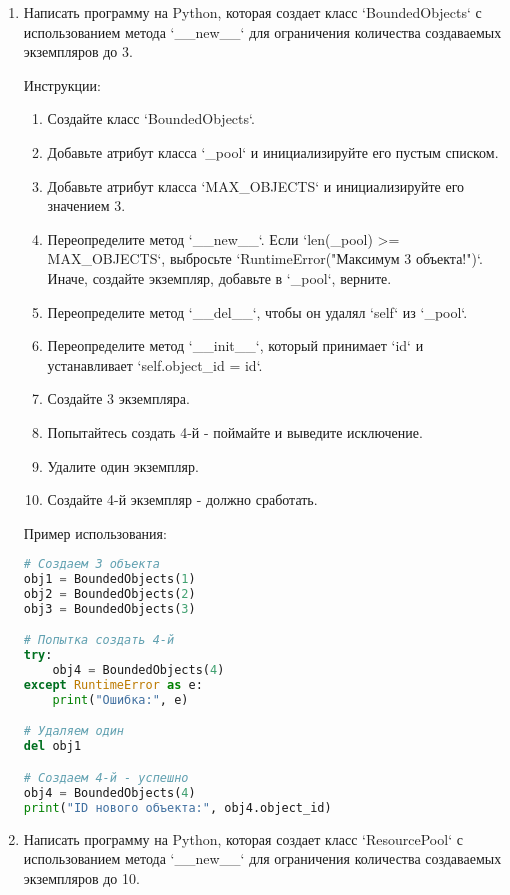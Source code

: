 \begin{enumerate}
\item Написать программу на Python, которая создает класс `BoundedObjects` с использованием метода `\_\_new\_\_` для ограничения количества создаваемых экземпляров до 3.

Инструкции:
\begin{enumerate}
    \item Создайте класс `BoundedObjects`.
    \item Добавьте атрибут класса `\_pool` и инициализируйте его пустым списком.
    \item Добавьте атрибут класса `MAX\_OBJECTS` и инициализируйте его значением 3.
    \item Переопределите метод `\_\_new\_\_`. Если `len(\_pool) >= MAX\_OBJECTS`, выбросьте `RuntimeError("Максимум 3 объекта!")`. Иначе, создайте экземпляр, добавьте в `\_pool`, верните.
    \item Переопределите метод `\_\_del\_\_`, чтобы он удалял `self` из `\_pool`.
    \item Переопределите метод `\_\_init\_\_`, который принимает `id` и устанавливает `self.object\_id = id`.
    \item Создайте 3 экземпляра.
    \item Попытайтесь создать 4-й - поймайте и выведите исключение.
    \item Удалите один экземпляр.
    \item Создайте 4-й экземпляр - должно сработать.
\end{enumerate}

Пример использования:
\begin{lstlisting}[language=Python]
# Создаем 3 объекта
obj1 = BoundedObjects(1)
obj2 = BoundedObjects(2)
obj3 = BoundedObjects(3)

# Попытка создать 4-й
try:
    obj4 = BoundedObjects(4)
except RuntimeError as e:
    print("Ошибка:", e)

# Удаляем один
del obj1

# Создаем 4-й - успешно
obj4 = BoundedObjects(4)
print("ID нового объекта:", obj4.object_id)
\end{lstlisting}

\item Написать программу на Python, которая создает класс `ResourcePool` с использованием метода `\_\_new\_\_` для ограничения количества создаваемых экземпляров до 10.


\end{enumerate}
